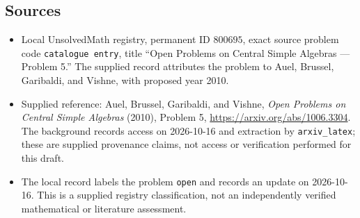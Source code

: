 \documentclass[11pt]{article}
\begin{document}
\subsection{Sources}
\begin{itemize}
\item Local UnsolvedMath registry, permanent ID \(800695\), exact source problem code \texttt{catalogue entry}, title ``Open Problems on Central Simple Algebras --- Problem 5.'' The supplied record attributes the problem to Auel, Brussel, Garibaldi, and Vishne, with proposed year 2010.
\item Supplied reference: Auel, Brussel, Garibaldi, and Vishne, \emph{Open Problems on Central Simple Algebras} (2010), Problem 5, \url{https://arxiv.org/abs/1006.3304}. The background records access on 2026-10-16 and extraction by \texttt{arxiv\_latex}; these are supplied provenance claims, not access or verification performed for this draft.
\item The local record labels the problem \texttt{open} and records an update on 2026-10-16. This is a supplied registry classification, not an independently verified mathematical or literature assessment.
\end{itemize}
\end{document}
